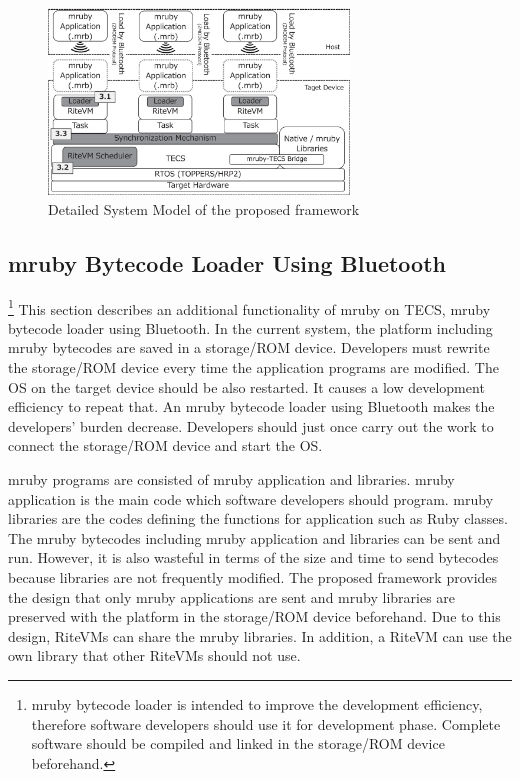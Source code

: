 \documentclass{sig-alternate-05-2015}
\begin{document}
\begin{figure}[t]
    \centering
    \includegraphics[width=8cm,clip]{figure/system_model.eps}
    \caption{Detailed System Model of the proposed framework}
    \label{fig:system_model}
\end{figure}

\subsection{mruby Bytecode Loader Using Bluetooth}
\label{sec:mruby bytecode loader using Bluetooth}
\footnote{
mruby bytecode loader is intended to improve the development efficiency, therefore software developers should use it for development phase.
Complete software should be compiled and linked in the storage/ROM device beforehand.
}
This section describes an additional functionality of mruby on TECS, mruby bytecode loader using Bluetooth.
In the current system, the platform including mruby bytecodes are saved in a storage/ROM device.
Developers must rewrite the storage/ROM device every time the application programs are modified.
The OS on the target device should be also restarted.
It causes a low development efficiency to repeat that.
An mruby bytecode loader using Bluetooth makes the developers' burden decrease.
Developers should just once carry out the work to connect the storage/ROM device and start the OS. 

mruby programs are consisted of mruby application and libraries.
mruby application is the main code which software developers should program.
mruby libraries are the codes defining the functions for application such as Ruby classes. 
The mruby bytecodes including mruby application and libraries can be sent and run.
However, it is also wasteful in terms of the size and time to send bytecodes because libraries are not frequently modified. 
The proposed framework provides the design that only mruby applications are sent and mruby libraries are preserved with the platform in the storage/ROM device beforehand.
Due to this design, RiteVMs can share the mruby libraries.
In addition, a RiteVM can use the own library that other RiteVMs should not use.
\end{document}
